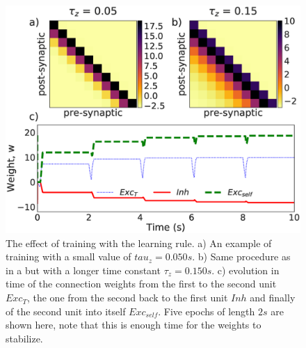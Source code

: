 \documentclass{esannV2}
\begin{document}
\begin{figure}[H]
\centering
\includegraphics[scale=0.3]{training_rule.eps}
\caption{The effect of training with the learning rule. a) An example of training with a small value of $tau_z=0.050s$. b) Same procedure as in a but with a longer time constant $\tau_z=0.150s$. c) evolution in time of the connection weights from the first to the second unit $Exc_T$, the one from the second back to the first unit $Inh$ and finally of the second unit into itself $Exc_{self}$. Five epochs of length $2s$ are shown here, note that this is enough time for the weights to stabilize.}\label{Fig:epochs}
\end{figure}



%
%
%
%
\end{document}
